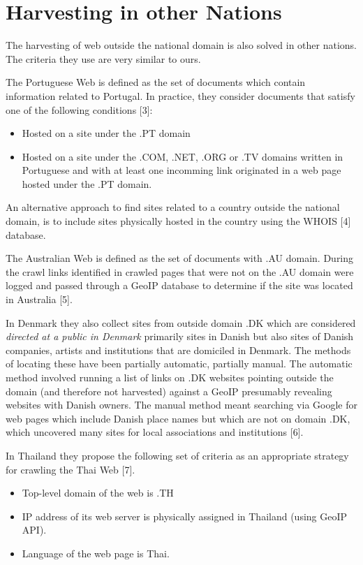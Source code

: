 \documentclass[11pt,a4paper]{article}
\begin{document}

\section{Harvesting in other Nations}

The harvesting of web outside the national domain is also solved in other nations. The criteria they use are very similar to ours.

The Portuguese Web is defined as the set of documents which contain information related to Portugal. In practice, they consider documents that satisfy one of the following conditions [3]:
\begin{itemize}
\item Hosted on a site under the .PT domain
\item Hosted on a site under the .COM, .NET, .ORG or .TV domains written in Portuguese and with at least one incomming link originated in a web page hosted under the .PT domain.
\end{itemize}
An alternative approach to find sites related to a country outside the national domain, is to include sites physically hosted in the country using the WHOIS [4] database.	

The Australian Web is defined as the set of documents with .AU domain. During the crawl links identified in crawled pages that were not on the .AU domain were logged and passed through a GeoIP database to determine if the site was located in Australia [5]. 

In Denmark they also collect sites from outside domain .DK which are considered \emph{directed at a public in Denmark} primarily sites in Danish but also sites of Danish companies, artists and institutions that are domiciled in Denmark. The methods of locating these have been partially automatic, partially manual. The automatic method involved running a list of links on .DK websites pointing outside the domain (and therefore not harvested) against a GeoIP presumably revealing websites with Danish owners. The manual method meant searching via Google for web pages which include Danish place names but which are not on domain .DK, which uncovered many sites for local associations and institutions [6].

In Thailand they propose the following set of criteria as an appropriate strategy for crawling the Thai Web [7].
\begin{itemize}
\item Top-level domain of the web is .TH
\item IP address of its web server is physically assigned in Thailand (using GeoIP API).
\item Language of the web page is Thai.
\end{itemize}
\end{document}

